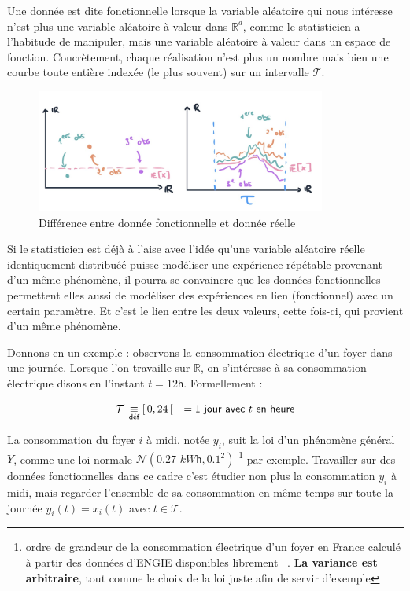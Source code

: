 
Une donnée est dite fonctionnelle lorsque la variable aléatoire qui nous intéresse n'est plus une variable aléatoire à valeur dans $\mathds R^d$, comme le statisticien a l'habitude de manipuler, mais une variable aléatoire à valeur dans un espace de fonction. Concrètement, chaque réalisation n'est plus un nombre mais bien une courbe toute entière indexée (le plus souvent) sur un intervalle $\mathcal T$.

\begin{figure}[H]
	\centering
	\includegraphics[width=0.85\textwidth]{Images/motivation/donneesRvsFD.jpg}
	\caption{Différence entre donnée fonctionnelle et donnée réelle}
	\label{img:RvsFD}
\end{figure}

Si le statisticien est déjà à l'aise avec l'idée qu'une variable aléatoire réelle identiquement distribuéé puisse modéliser une expérience répétable provenant d'un même phénomène, il pourra se convaincre que les données fonctionnelles permettent elles aussi de modéliser des expériences en lien (fonctionnel) avec un certain paramètre. Et c'est le lien entre les deux valeurs, cette fois-ci, qui provient d'un même phénomène.

\largeskip

Donnons en un exemple : observons la consommation électrique d'un foyer dans une journée. Lorsque l'on travaille sur $\mathds R$, on s'intéresse à sa consommation électrique disons en l'instant $t = 12\mathsf{h}$. Formellement :

\begin{equation*}
	\mathcal T \, \isdef [\, 0,24 \,[ \quad = \textsf{1 jour avec } t \textsf{ en heure}
\end{equation*}

La consommation du foyer $i$ à midi, notée $y_i$, suit la loi d'un phénomène général $Y$, comme une loi normale $\mathcal N\left( 0.27 \, \, kW\mathsf h, 0.1^2 \right)$
%
\footnote{ ordre de grandeur de la consommation électrique d'un foyer en France calculé à partir des données d'ENGIE disponibles librement ~\cite{engie-data-conso-moy-par-an}. \textbf{La variance est arbitraire}, tout comme le choix de la loi juste afin de servir d'exemple }
%
par exemple. Travailler sur des données fonctionnelles dans ce cadre c'est étudier non plus la consommation $y_i$ à midi, mais regarder l'ensemble de sa consommation en même temps sur toute la journée $y_i(t) = x_i(t)$ avec $t \in \mathcal T$.

